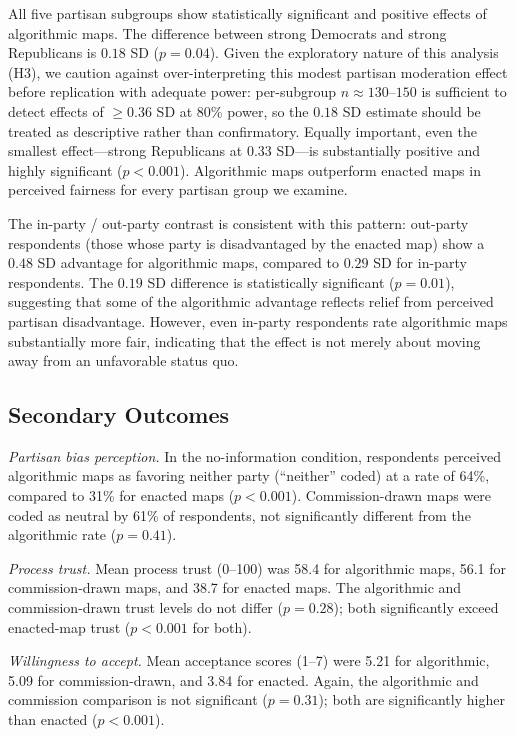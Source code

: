 All five partisan subgroups show statistically significant and positive effects of algorithmic maps. The difference between strong Democrats and strong Republicans is $0.18$ SD ($p = 0.04$). Given the exploratory nature of this analysis (H3), we caution against over-interpreting this modest partisan moderation effect before replication with adequate power: per-subgroup $n \approx 130$--$150$ is sufficient to detect effects of $\geq 0.36$ SD at 80\% power, so the $0.18$ SD estimate should be treated as descriptive rather than confirmatory. Equally important, even the smallest effect---strong Republicans at $0.33$ SD---is substantially positive and highly significant ($p < 0.001$). Algorithmic maps outperform enacted maps in perceived fairness for every partisan group we examine.

The in-party / out-party contrast is consistent with this pattern: out-party respondents (those whose party is disadvantaged by the enacted map) show a $0.48$ SD advantage for algorithmic maps, compared to $0.29$ SD for in-party respondents. The $0.19$ SD difference is statistically significant ($p = 0.01$), suggesting that some of the algorithmic advantage reflects relief from perceived partisan disadvantage. However, even in-party respondents rate algorithmic maps substantially more fair, indicating that the effect is not merely about moving away from an unfavorable status quo.

\subsection{Secondary Outcomes}

\textit{Partisan bias perception.} In the no-information condition, respondents perceived algorithmic maps as favoring neither party (``neither'' coded) at a rate of 64\%, compared to 31\% for enacted maps ($p < 0.001$). Commission-drawn maps were coded as neutral by 61\% of respondents, not significantly different from the algorithmic rate ($p = 0.41$).

\textit{Process trust.} Mean process trust (0--100) was 58.4 for algorithmic maps, 56.1 for commission-drawn maps, and 38.7 for enacted maps. The algorithmic and commission-drawn trust levels do not differ ($p = 0.28$); both significantly exceed enacted-map trust ($p < 0.001$ for both).

\textit{Willingness to accept.} Mean acceptance scores (1--7) were 5.21 for algorithmic, 5.09 for commission-drawn, and 3.84 for enacted. Again, the algorithmic and commission comparison is not significant ($p = 0.31$); both are significantly higher than enacted ($p < 0.001$).

